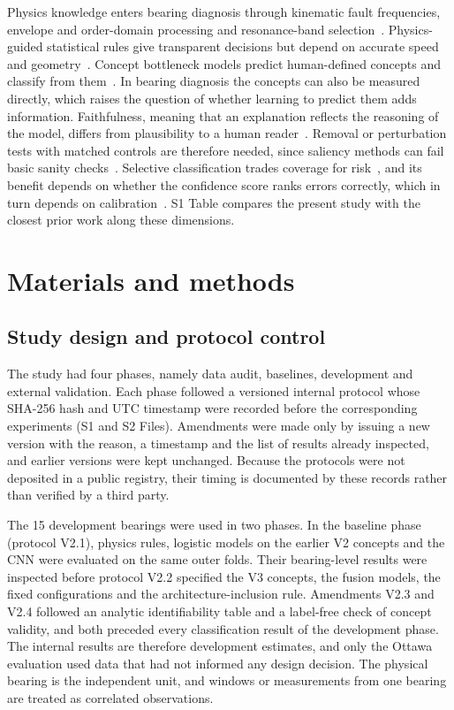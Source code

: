 \documentclass[10pt,letterpaper]{article}
\begin{document}
Physics knowledge enters bearing diagnosis through kinematic fault frequencies, envelope and order-domain processing and resonance-band selection~\cite{randall2011rolling,antoni2007fast,fyfe1997analysis}. Physics-guided statistical rules give transparent decisions but depend on accurate speed and geometry~\cite{siddique2026physics}. Concept bottleneck models predict human-defined concepts and classify from them~\cite{koh2020concept}. In bearing diagnosis the concepts can also be measured directly, which raises the question of whether learning to predict them adds information. Faithfulness, meaning that an explanation reflects the reasoning of the model, differs from plausibility to a human reader~\cite{jacovi2020towards}. Removal or perturbation tests with matched controls are therefore needed, since saliency methods can fail basic sanity checks~\cite{adebayo2018sanity,hooker2019benchmark}. Selective classification trades coverage for risk~\cite{geifman2017selective}, and its benefit depends on whether the confidence score ranks errors correctly, which in turn depends on calibration~\cite{guo2017calibration}. S1 Table compares the present study with the closest prior work along these dimensions.

\section*{Materials and methods}

\subsection*{Study design and protocol control}
The study had four phases, namely data audit, baselines, development and external validation. Each phase followed a versioned internal protocol whose SHA-256 hash and UTC timestamp were recorded before the corresponding experiments (S1 and S2 Files). Amendments were made only by issuing a new version with the reason, a timestamp and the list of results already inspected, and earlier versions were kept unchanged. Because the protocols were not deposited in a public registry, their timing is documented by these records rather than verified by a third party.

The 15 development bearings were used in two phases. In the baseline phase (protocol V2.1), physics rules, logistic models on the earlier V2 concepts and the CNN were evaluated on the same outer folds. Their bearing-level results were inspected before protocol V2.2 specified the V3 concepts, the fusion models, the fixed configurations and the architecture-inclusion rule. Amendments V2.3 and V2.4 followed an analytic identifiability table and a label-free check of concept validity, and both preceded every classification result of the development phase. The internal results are therefore development estimates, and only the Ottawa evaluation used data that had not informed any design decision. The physical bearing is the independent unit, and windows or measurements from one bearing are treated as correlated observations.
\end{document}

